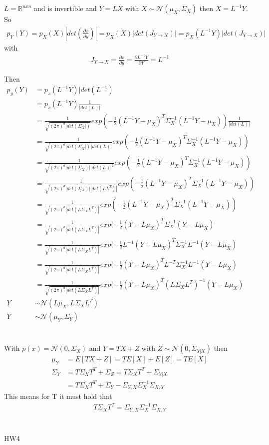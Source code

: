 \documentclass[11pt]{article}
\newcommand{\exercise}{\section{}}
\begin{document}
\exercise
$L = \mathbb{R}^{nxn}$ and is invertible and $Y = LX$ with $X\sim \mathcal{N}(\mu_X,\Sigma_X)$
then $X = L^{-1}Y$. So
\begin{align}
	p_Y(Y) = p_X(X) |det(\frac{\partial x}{\partial y})| = p_X(X) |det(J_{Y \rightarrow X})| = p_X(L^{-1}Y)|det(J_{Y\rightarrow X})|
\end{align}
with
\begin{align}
	J_{Y\rightarrow X} = \frac{\partial x}{\partial y} = \frac{\partial L^{-1}Y}{\partial Y} = L^{-1}
\end{align}

Then
\begin{align}
	p_y(Y) &= p_x(L^{-1}Y)|det(L^{-1}) \\
	&= p_x(L^{-1}Y) \frac{1}{|det(L)|} \\
	&= \frac{1}{\sqrt{(2\pi)^d|det(\Sigma_X|)}}exp(-\frac{1}{2}(L^{-1}Y-\mu_X)^T\Sigma_X^{-1}(L^{-1}Y-\mu_X)) \frac{1}{|det(L)|} \\
	&= \frac{1}{\sqrt{(2\pi)^d|det(\Sigma_X|)}|det(L)|}exp(-\frac{1}{2}(L^{-1}Y-\mu_X)^T\Sigma_X^{-1}(L^{-1}Y-\mu_X)) \\
	&=
	\frac{1}{\sqrt{(2\pi)^d|det(\Sigma_X)||det(L)|^2}}exp(-\frac{1}{2}(L^{-1}Y-\mu_X)^T\Sigma_X^{-1}(L^{-1}Y-\mu_X)) \\
	&=
	\frac{1}{\sqrt{(2\pi)^d|det(\Sigma_X)||det(LL^T)|}}exp(-\frac{1}{2}(L^{-1}Y-\mu_X)^T\Sigma_X^{-1}(L^{-1}Y-\mu_X)) \\
	&=
	\frac{1}{\sqrt{(2\pi)^d|det(L\Sigma_XL^T)|}}exp(-\frac{1}{2}(L^{-1}Y-\mu_X)^T\Sigma_X^{-1}(L^{-1}Y-\mu_X)) \\
	&=
	\frac{1}{\sqrt{(2\pi)^d|det(L\Sigma_XL^T)|}}exp(-\frac{1}{2}(Y-L\mu_X)^T\Sigma_X^{-1}(Y-L\mu_X) \\
	&=
	\frac{1}{\sqrt{(2\pi)^d|det(L\Sigma_XL^T)|}}exp(-\frac{1}{2}L^{-1}(Y-L\mu_X)^T\Sigma_X^{-1}L^{-1}(Y-L\mu_X) \\
	&=
	\frac{1}{\sqrt{(2\pi)^d|det(L\Sigma_XL^T)|}}exp(-\frac{1}{2}(Y-L\mu_X)^TL^{-T}\Sigma_X^{-1}L^{-1}(Y-L\mu_X) \\
	&=
	\frac{1}{\sqrt{(2\pi)^d|det(L\Sigma_XL^T)|}}exp(-\frac{1}{2}(Y-L\mu_X)^T(L\Sigma_XL^T)^{-1}(Y-L\mu_X) \\
	Y &\sim \mathcal{N}(L\mu_X, L\Sigma_XL^T) \\
	Y &\sim \mathcal{N}(\mu_Y,\Sigma_Y)
\end{align}


\exercise
With $p(x) = \mathcal{N}(0, \Sigma_{X})$ and $Y = TX + Z$ with $Z \sim
 \mathcal{N}(0, \Sigma_{Y|X}) $ then
\begin{align}
	\mu_Y &= E[TX+Z] = TE[X] + E[Z] = TE[X] \\
	\Sigma_Y &= T \Sigma_XT^T + \Sigma_Z = T\Sigma_XT^T + \Sigma_{Y|X} \\
					&= T\Sigma_XT^T + \Sigma_Y - \Sigma_{Y,X}\Sigma_{X}^{-1}\Sigma_{X,Y}
\end{align}
This means for T it must hold that
\begin{align}
	T\Sigma_XT^T = \Sigma_{Y,X}\Sigma_{X}^{-1}\Sigma_{X,Y}
\end{align}

\exercise
HW4
\end{document}
